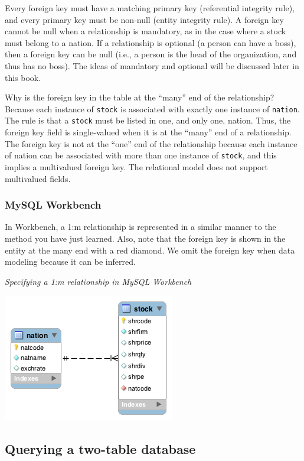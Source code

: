 \documentclass[
]{article}
\begin{document}
Every foreign key must have a matching primary key (referential
integrity rule), and every primary key must be non-null (entity
integrity rule). A foreign key cannot be null when a relationship is
mandatory, as in the case where a stock must belong to a nation. If a
relationship is optional (a person can have a boss), then a foreign key
can be null (i.e., a person is the head of the organization, and thus
has no boss). The ideas of mandatory and optional will be discussed
later in this book.

Why is the foreign key in the table at the ``many'' end of the
relationship? Because each instance of \texttt{stock} is associated with
exactly one instance of \texttt{nation}. The rule is that a
\texttt{stock} must be listed in one, and only one, nation. Thus, the
foreign key field is single-valued when it is at the ``many'' end of a
relationship. The foreign key is not at the ``one'' end of the
relationship because each instance of nation can be associated with more
than one instance of \texttt{stock}, and this implies a multivalued
foreign key. The relational model does not support multivalued fields.

\hypertarget{mysql-workbench}{%
\subsubsection{MySQL Workbench}\label{mysql-workbench}}

In Workbench, a 1:m relationship is represented in a similar manner to
the method you have just learned. Also, note that the foreign key is
shown in the entity at the many end with a red diamond. We omit the
foreign key when data modeling because it can be inferred.

\emph{Specifying a 1:m relationship in MySQL Workbench}

\includegraphics{Figures/Chapter 4/wb-stock-nation.png}

\hypertarget{querying-a-two-table-database}{%
\subsection{Querying a two-table
database}\label{querying-a-two-table-database}}
\end{document}
